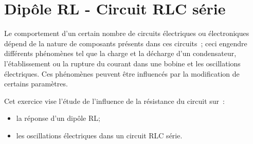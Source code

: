 \section{Dipôle RL - Circuit RLC série}
Le comportement d'un certain nombre de circuits électriques ou électroniques
dépend de la nature de composants présents dans ces circuits~; ceci engendre
différents phénomènes tel que la charge et la décharge d'un condensateur,
l'établissement ou la rupture du courant dans une bobine et les oscillations
électriques. Ces phénomènes peuvent être influencés par la modification de
certains paramètres.

Cet exercice vise l'étude de l'influence de la résistance du circuit sur~:

\begin{itemize}
  \item la réponse d'un dipôle RL;
  \item les oscillations électriques dans un circuit RLC série.
\end{itemize}

